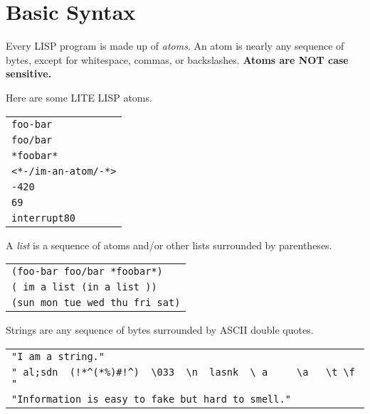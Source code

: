 \documentclass[
letterpaper,
oneside,
]{memoir}
\begin{document}
\maketitle
\clearpage
\tableofcontents

\chapter{Basic Syntax}

Every LISP program is made up of \emph{atoms}. An atom is nearly any sequence of bytes, except for whitespace, commas, or backslashes. \textbf{Atoms are NOT case sensitive.}

\vspace{1em}

\noindent
Here are some LITE LISP atoms.

\vspace{1em}
\begin{tabular}{l}
  \texttt{foo-bar} \\
  \texttt{foo/bar} \\
  \texttt{*foobar*} \\
  \texttt{<*-/im-an-atom/-*>} \\
  \texttt{-420} \\
  \texttt{69} \\
  \texttt{interrupt80} \\
\end{tabular}
\vspace{1em}

\filbreak
\noindent
A \emph{list} is a sequence of atoms and/or other lists surrounded by parentheses.

\vspace{1em}
\begin{tabular}{l}
  \texttt{(foo-bar foo/bar *foobar*)} \\
  \texttt{(   im a    list (in a list ))} \\
  \texttt{(sun mon tue wed thu fri sat)} \\
\end{tabular}
\vspace{1em}

\filbreak
\noindent
Strings are any sequence of bytes surrounded by ASCII double quotes.

\vspace{1em}
\begin{tabular}{l}
  \texttt{"I am a string."} \\
  \verb|" al;sdn  (!*^(*%)#!^)  \033  \n  lasnk  \ a     \a   \t \f "| \\
  \texttt{"Information is easy to fake but hard to smell."} \\
\end{tabular}
\vspace{1em}
\end{document}
